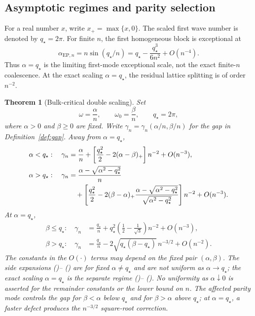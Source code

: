 \documentclass[twoside,10pt]{article}
\numberwithin{equation}{section}
\theoremstyle{slbody}
\newtheorem{theorem}{Theorem}[section]
\theoremstyle{definition}
\theoremstyle{remark}
\renewcommand{\eqref}[1]{%
  \textup{{\normalfont(\oldstylenums{\ref{#1}}}\normalfont)}}
\begin{document}
\subsection{Asymptotic regimes and parity selection}

For a real number $x$, write $x_+=\max\{x,0\}$.  The scaled first
wave number is denoted by $q_\star=2\pi$.
For finite $n$, the first homogeneous block is exceptional at
\begin{equation}\label{eq:finite-critical-ep}
 \alpha_{\mathrm{EP},n}
 =n\sin(q_\star/n)
 =q_\star-\frac{q_\star^3}{6n^2}+O(n^{-4}).
\end{equation}
Thus $\alpha=q_\star$ is the limiting first-mode exceptional scale, not
the exact finite-$n$ coalescence.  At the exact scaling
$\alpha=q_\star$, the residual lattice splitting is of order $n^{-2}$.

\begin{theorem}[Bulk-critical double scaling]\label{thm:critical-gap}
Set
\[
 \omega=\frac{\alpha}{n},\qquad
 \omega_0=\frac{\beta}{n},\qquad
 q_\star=2\pi,
\]
where $\alpha>0$ and $\beta\ge0$ are fixed.
Write $\gamma_n=\gamma_n(\alpha/n,\beta/n)$ for the gap in
Definition~\ref{def:gap}.  Away from $\alpha=q_\star$,
\begin{align}
\alpha<q_\star:\quad
 \gamma_n
 &=\frac{\alpha}{n}
   +\left[\frac{q_\star^2}{2}-2(\alpha-\beta)_+\right]n^{-2}
   +O(n^{-3}),\label{eq:critical-below}\\
\alpha>q_\star:\quad
 \gamma_n
 &=\frac{\alpha-\sqrt{\alpha^2-q_\star^2}}{n}\notag\\
 &\quad+\left[\frac{q_\star^2}{2}
 -2(\beta-\alpha)_+
   \frac{\alpha-\sqrt{\alpha^2-q_\star^2}}
        {\sqrt{\alpha^2-q_\star^2}}\right]n^{-2}
 +O(n^{-3}).\label{eq:critical-above}
\end{align}
At $\alpha=q_\star$,
\begin{align}
 \beta\le q_\star:\quad
 \gamma_n&=\frac{q_\star}{n}
 +q_\star^2\left(\frac12-\frac1{\sqrt3}\right)n^{-2}
 +O(n^{-3}),\label{eq:critical-at-slow}\\
 \beta>q_\star:\quad
 \gamma_n&=\frac{q_\star}{n}
 -2\sqrt{q_\star(\beta-q_\star)}\,n^{-3/2}+O(n^{-2}).
 \label{eq:critical-at-fast}
\end{align}
The constants in the $O(\cdot)$ terms may depend on the fixed pair
$(\alpha,\beta)$.  The side expansions
\eqref{eq:critical-below}--\eqref{eq:critical-above} are for fixed
$\alpha\ne q_\star$ and are not uniform as $\alpha\to q_\star$; the
exact scaling $\alpha=q_\star$ is the separate regime
\eqref{eq:critical-at-slow}--\eqref{eq:critical-at-fast}.  No uniformity
as $\alpha\downarrow0$ is asserted for the remainder constants or the
lower bound on $n$.  The affected parity mode controls the gap for
$\beta<\alpha$ below $q_\star$ and for $\beta>\alpha$ above
$q_\star$; at $\alpha=q_\star$, a faster defect produces the
$n^{-3/2}$ square-root correction.
\end{theorem}
\end{document}
